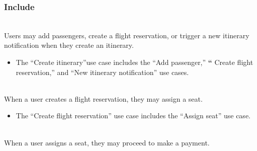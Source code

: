 \begin{table}[htbp]
\centering
\small
{}
\end{table}

\subsubsection{Include}\label{E6c3ykAkGs3AZ07d6dOGz-2}
\\
Users may add passengers, create a flight reservation, or trigger a new itinerary notification when they create an itinerary.

\begin{itemize}
\item
The ``Create itinerary''use case includes the ``Add passenger,'' \textbf{``} Create flight reservation,'' and ``New itinerary notification'' use cases.
\end{itemize}
\\
When a user creates a flight reservation, they may assign a seat.

\begin{itemize}
\item
The ``Create flight reservation'' use case includes the ``Assign seat'' use case.
\end{itemize}
\\
When a user assigns a seat, they may proceed to make a payment.

